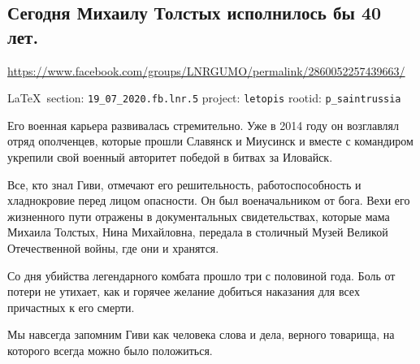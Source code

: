  
 

\subsection{Сегодня Михаилу Толстых исполнилось бы 40 лет.}
\label{sec:19_07_2020.fb.lnr.5}
\url{https://www.facebook.com/groups/LNRGUMO/permalink/2860052257439663/}
  
\vspace{0.5cm}
{\small\LaTeX~section: \verb|19_07_2020.fb.lnr.5| project: \verb|letopis| rootid: \verb|p_saintrussia|}
\vspace{0.5cm}


Его военная карьера развивалась стремительно. Уже в 2014 году он возглавлял
отряд ополченцев, которые прошли Славянск и Миусинск и вместе с командиром
укрепили свой военный авторитет победой в битвах за Иловайск.

Все, кто знал Гиви, отмечают его решительность, работоспособность и
хладнокровие перед лицом опасности. Он был военачальником от бога. Вехи его
жизненного пути отражены в документальных свидетельствах, которые мама Михаила
Толстых, Нина Михайловна, передала в столичный Музей Великой Отечественной
войны, где они и хранятся.

Со дня убийства легендарного комбата прошло три с половиной года. Боль от
потери не утихает, как и горячее желание добиться наказания для всех причастных
к его смерти.

Мы навсегда запомним Гиви как человека слова и дела, верного товарища, на
которого всегда можно было положиться. 
